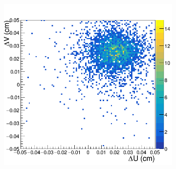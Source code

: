 \begin{figure}[h!]
\centering
 \begin{subfigure}[l]{.45\textwidth}
   \centering
   \includegraphics[width=\linewidth]{thesis_figures/alignment/Run_3211_before/square/MX4.png}


\end{subfigure}
\end{figure}
